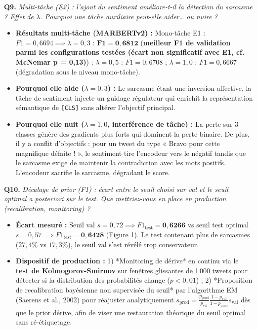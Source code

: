 \documentclass[10pt,a4paper]{article}
\newcommand{\questiontitle}[2]{%
  \noindent\textbf{#1.} \textit{#2}\par\vspace{1.5pt}%
}
\begin{document}
\newpage

\questiontitle{Q9}{Multi-tâche (E2) : l'ajout du sentiment améliore-t-il la détection du sarcasme ? Effet de $\lambda$. Pourquoi une tâche auxiliaire peut-elle aider… ou nuire ?}
\begin{tcolorbox}[reponsebox]
  \begin{itemize}
    \item \textbf{Résultats multi-tâche (MARBERTv2) :} Mono-tâche E1 : $F1 = 0{,}6694 \implies \lambda=0{,}3$ : $\mathbf{F1 = 0{,}6812}$ (\textbf{meilleur F1 de validation parmi les configurations testées (écart non significatif avec E1, cf. McNemar p = 0,13)}) ; $\lambda=0{,}5$ : $F1 = 0{,}6708$ ; $\lambda=1{,}0$ : $F1 = 0{,}6667$ (dégradation sous le niveau mono-tâche).
    \item \textbf{Pourquoi elle aide ($\lambda=0{,}3$) :} Le sarcasme étant une inversion affective, la tâche de sentiment injecte un guidage régulateur qui enrichit la représentation sémantique de \texttt{[CLS]} sans altérer l'objectif principal.
    \item \textbf{Pourquoi elle nuit ($\lambda=1{,}0$, interférence de tâche) :} La perte sur 3 classes génère des gradients plus forts qui dominent la perte binaire. De plus, il y a conflit d'objectifs : pour un tweet du type « Bravo pour cette magnifique défaite ! », le sentiment tire l'encodeur vers le négatif tandis que le sarcasme exige de maintenir la contradiction avec les mots positifs. L'encodeur sacrifie le sarcasme, dégradant le score.
  \end{itemize}
\end{tcolorbox}

\questiontitle{Q10}{Décalage de prior (F1) : écart entre le seuil choisi sur val et le seuil optimal a posteriori sur le test. Que mettriez-vous en place en production (recalibration, monitoring) ?}
\begin{tcolorbox}[reponsebox]
  \begin{itemize}
    \item \textbf{Écart mesuré :} Seuil val $s=0{,}72 \implies F1_{\text{test}} = \mathbf{0{,}6266}$ vs seuil test optimal $s=0{,}57 \implies F1_{\text{test}} = \mathbf{0{,}6428}$ (Figure 1). Le test contenant plus de sarcasmes ($27{,}4\%$ vs $17{,}3\%$), le seuil val s'est révélé trop conservateur.
    \item \textbf{Dispositif de production :} 1) *Monitoring de dérive* en continu via le \textbf{test de Kolmogorov-Smirnov} sur fenêtres glissantes de 1\,000 tweets pour détecter si la distribution des probabilités change ($p < 0{,}01$) ; 2) *Proposition de recalibration bayésienne non supervisée du seuil* par l'algorithme EM (Saerens et al., 2002) pour réajuster analytiquement $s_{\text{prod}} = \frac{p_{\text{prod}}}{p_{\text{val}}} \frac{1-p_{\text{val}}}{1-p_{\text{prod}}} s_{\text{val}}$ dès que le prior dérive, afin de viser une restauration théorique du seuil optimal sans ré-étiquetage.
  \end{itemize}
\end{tcolorbox}
\end{document}
